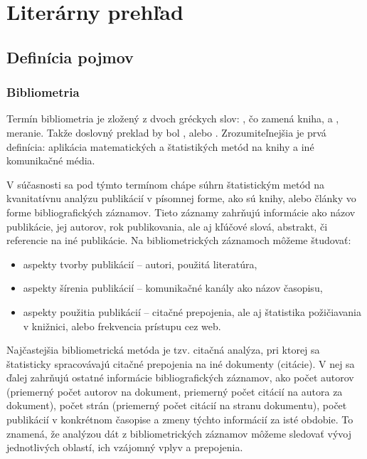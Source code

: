 \chapter{Literárny prehľad}
\setcounter{page}{1}

\section{Definícia pojmov}

\subsection{Bibliometria}

Termín bibliometria je zložený z dvoch gréckych slov: , čo
zamená kniha, a , meranie.  Takže doslovný preklad by bol
, alebo .
Zrozumiteľnejšia je prvá definícia: aplikácia matematických a štatistikých metód
na knihy a iné komunikačné média.  \citep{Pritchard1969}

V súčasnosti sa pod týmto termínom chápe súhrn štatistickým metód na
kvanitatívnu analýzu publikácií v písomnej forme, ako sú knihy, alebo články vo
forme bibliografických záznamov.  Tieto záznamy zahrňujú informácie ako názov
publikácie, jej autorov, rok publikovania, ale aj kľúčové slová, abstrakt, či
referencie na iné publikácie.  Na bibliometrických záznamoch môžeme študovať:

\begin{itemize}
\item aspekty tvorby publikácií -- autori, použitá literatúra,
\item aspekty šírenia publikácií -- komunikačné kanály ako názov časopisu,
\item aspekty použitia publikácií -- citačné prepojenia, ale aj štatistika
  požičiavania v knižnici, alebo frekvencia prístupu cez web.  \citep{Ondrisova2011}
\end{itemize}

Najčastejšia bibliometrická metóda je tzv.  citačná analýza, pri ktorej sa
štatisticky spracovávajú citačné prepojenia na iné dokumenty (citácie).  V nej
sa ďalej zahrňujú ostatné informácie bibliografických záznamov, ako počet
autorov (priemerný počet autorov na dokument, priemerný počet citácií na autora
za dokument), počet strán (priemerný počet citácií na stranu dokumentu), počet
publikácií v konkrétnom časopise a zmeny týchto informácií za isté obdobie.  To
znamená, že analýzou dát z bibliometrických záznamov môžeme sledovať vývoj
jednotlivých oblastí, ich vzájomný vplyv a prepojenia.

